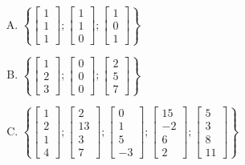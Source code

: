 \begin{enumerate}[A.]


\item
$\left\{ \left[ \begin{array}{c} 1 \\ 1 \\ 1 \end{array} \right]; 
\left[ \begin{array}{c} 1 \\ 1 \\ 0 \end{array} \right]; 
\left[ \begin{array}{c} 1 \\ 0 \\ 1 \end{array} \right] \right\}
$


\item
$\left\{\left[ \begin{array}{c} 1 \\ 2 \\ 3 \end{array} \right] ; 
\left[ \begin{array}{c} 0 \\ 0 \\ 0 \end{array} \right] ; 
\left[ \begin{array}{c} 2 \\ 5 \\ 7 \end{array} \right] \right\} $



\item
$\left\{\left[ \begin{array}{c} 1 \\ 2 \\ 1 \\ 4\end{array} \right] ; 
\left[ \begin{array}{c} 2 \\ 13 \\ 3 \\ 7\end{array} \right] ; 
\left[ \begin{array}{c} 0 \\ 1 \\ 5 \\ -3\end{array} \right] ;
\left[ \begin{array}{c} 15 \\ -2 \\ 6 \\ 2\end{array} \right] ;
\left[ \begin{array}{c} 5 \\ 3 \\ 8 \\ 11\end{array} \right] \right\} $




\end{enumerate}
